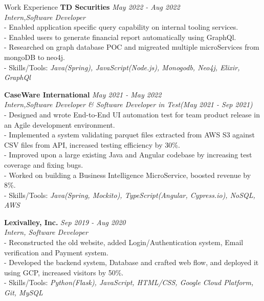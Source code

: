 \documentclass{resume} %
\begin{document}
\begin{rSection}{Work Experience}
{\bf TD Securities} \hfill {\em May 2022 - Aug 2022} 
\\{\textit{Intern,Software Developer}}
\\- Enabled application specific query capability on internal tooling services.
\\- Enabled users to generate financial report automatically using GraphQl.
\\- Researched on graph database POC and migreated multiple microServices from mongoDB  to neo4j.
\\- Skills/Tools: \emph{Java(Spring), JavaScript(Node.js), Monogodb, Neo4j, Elixir, GraphQl}

{\bf CaseWare International} \hfill {\em May 2021 - May 2022} 
\\{\textit{Intern,Software Developer \& Software Developer in Test(May 2021 - Sep 2021)}}
\\- Designed and wrote End-to-End UI automation test for team product release in an Agile development environment.
\\- Implemented a system validating parquet files extracted from AWS S3 against CSV files from API, increased testing efficiency by 30\%.
\\- Improved upon a large existing Java and Angular codebase by increasing test coverage and fixing bugs.
\\- Worked on building a Business Intelligence MicroService, boosted revenue by 8\%.
\\- Skills/Tools: \emph{Java(Spring, Mockito), TypeScript(Angular, Cypress.io), NoSQL, AWS}

{\bf Lexivalley, Inc. } \hfill {\em Sep 2019 - Aug 2020} 
\\{\textit{Intern, Software Developer}}
\\- Reconstructed the old website, added Login/Authentication system, Email verification and Payment system.
\\- Developed the backend system, Database and crafted web flow, and deployed it using GCP, increased visitors by 50\%.
\\- Skills/Tools: \emph{Python(Flask), JavaScript, HTML/CSS, Google Cloud Platform, Git, MySQL}

\end{rSection}
\end{document}

